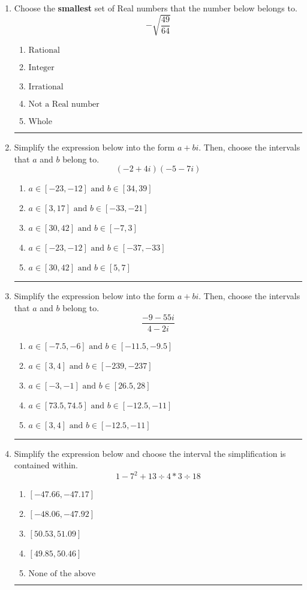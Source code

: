\documentclass[14pt]{extbook}
\newcommand{\litem}[1]{\item#1\hspace*{-1cm}\rule{\textwidth}{0.4pt}}
\begin{document}
\begin{enumerate}
\litem{
Choose the \textbf{smallest} set of Real numbers that the number below belongs to.\[ -\sqrt{\frac{49}{64}} \]\begin{enumerate}[label=\Alph*.]
\item \( \text{Rational} \)
\item \( \text{Integer} \)
\item \( \text{Irrational} \)
\item \( \text{Not a Real number} \)
\item \( \text{Whole} \)

\end{enumerate} }
\litem{
Simplify the expression below into the form $a+bi$. Then, choose the intervals that $a$ and $b$ belong to.\[ (-2 + 4 i)(-5 - 7 i) \]\begin{enumerate}[label=\Alph*.]
\item \( a \in [-23, -12] \text{ and } b \in [34, 39] \)
\item \( a \in [3, 17] \text{ and } b \in [-33, -21] \)
\item \( a \in [30, 42] \text{ and } b \in [-7, 3] \)
\item \( a \in [-23, -12] \text{ and } b \in [-37, -33] \)
\item \( a \in [30, 42] \text{ and } b \in [5, 7] \)

\end{enumerate} }
\litem{
Simplify the expression below into the form $a+bi$. Then, choose the intervals that $a$ and $b$ belong to.\[ \frac{-9 - 55 i}{4 - 2 i} \]\begin{enumerate}[label=\Alph*.]
\item \( a \in [-7.5, -6] \text{ and } b \in [-11.5, -9.5] \)
\item \( a \in [3, 4] \text{ and } b \in [-239, -237] \)
\item \( a \in [-3, -1] \text{ and } b \in [26.5, 28] \)
\item \( a \in [73.5, 74.5] \text{ and } b \in [-12.5, -11] \)
\item \( a \in [3, 4] \text{ and } b \in [-12.5, -11] \)

\end{enumerate} }
\litem{
Simplify the expression below and choose the interval the simplification is contained within.\[ 1 - 7^2 + 13 \div 4 * 3 \div 18 \]\begin{enumerate}[label=\Alph*.]
\item \( [-47.66, -47.17] \)
\item \( [-48.06, -47.92] \)
\item \( [50.53, 51.09] \)
\item \( [49.85, 50.46] \)
\item \( \text{None of the above} \)


\end{enumerate}}
\end{enumerate}
\end{document}
